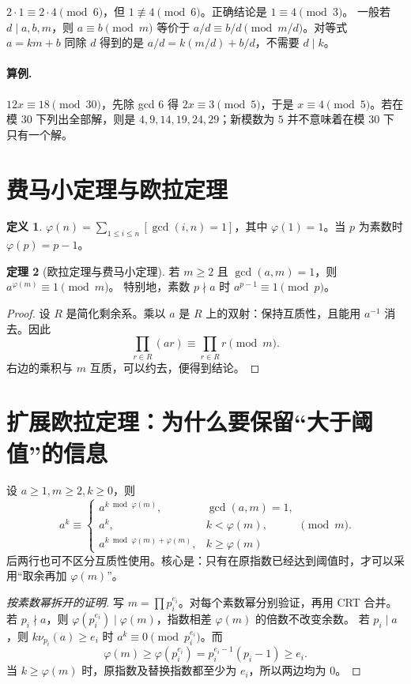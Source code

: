 \documentclass[UTF8,a4paper,11pt,oneside,openany,fontset=fandol]{ctexbook}
\theoremstyle{definition}
\newtheorem{definition}{定义}[chapter]
\newtheorem{theorem}[definition]{定理}
\newcommand{\iva}[1]{\left[#1\right]}
\begin{document}
\begin{pitfall}[把整数除法直接搬到同余式中会出错]
$2\cdot1\equiv2\cdot4\pmod6$，但 $1\not\equiv4\pmod6$。正确结论是 $1\equiv4\pmod3$。
一般若 $d\mid a,b,m$，则 $a\equiv b\pmod m$ 等价于 $a/d\equiv b/d\pmod{m/d}$。对等式 $a=km+b$ 同除 $d$ 得到的是 $a/d=k(m/d)+b/d$，不需要 $d\mid k$。
\end{pitfall}
\paragraph{算例.} $12x\equiv18\pmod{30}$，先除 gcd $6$ 得 $2x\equiv3\pmod5$，于是 $x\equiv4\pmod5$。若在模 $30$ 下列出全部解，则是 $4,9,14,19,24,29$；新模数为 $5$ 并不意味着在模 $30$ 下只有一个解。


\section{费马小定理与欧拉定理}
\begin{definition}
$\varphi(n)=\sum_{1\le i\le n}\iva{\gcd(i,n)=1}$，其中 $\varphi(1)=1$。当 $p$ 为素数时 $\varphi(p)=p-1$。
\end{definition}
\begin{theorem}[欧拉定理与费马小定理]
若 $m\ge2$ 且 $\gcd(a,m)=1$，则 $a^{\varphi(m)}\equiv1\pmod m$。
特别地，素数 $p\nmid a$ 时 $a^{p-1}\equiv1\pmod p$。
\end{theorem}
\begin{proof}
设 $R$ 是简化剩余系。乘以 $a$ 是 $R$ 上的双射：保持互质性，且能用 $a^{-1}$ 消去。因此
\[
 \prod_{r\in R}(ar)\equiv\prod_{r\in R}r\pmod m.
\]
右边的乘积与 $m$ 互质，可以约去，便得到结论。
\end{proof}


\section{扩展欧拉定理：为什么要保留“大于阈值”的信息}
设 $a\ge1,m\ge2,k\ge0$，则
\[
 a^k\equiv
 \begin{cases}
 a^{k\bmod\varphi(m)},&\gcd(a,m)=1,\\
 a^k,&k<\varphi(m),\\
 a^{k\bmod\varphi(m)+\varphi(m)},&k\ge\varphi(m)
 \end{cases}\pmod m.
\]
后两行也可不区分互质性使用。核心是：只有在原指数已经达到阈值时，才可以采用“取余再加 $\varphi(m)$”。


\begin{proof}[按素数幂拆开的证明]
写 $m=\prod p_i^{e_i}$。对每个素数幂分别验证，再用 CRT 合并。
若 $p_i\nmid a$，则 $\varphi(p_i^{e_i})\mid\varphi(m)$，指数相差 $\varphi(m)$ 的倍数不改变余数。
若 $p_i\mid a$，则 $k\nu_{p_i}(a)\ge e_i$ 时 $a^k\equiv0\pmod{p_i^{e_i}}$。而
\[
\varphi(m)\ge\varphi(p_i^{e_i})=p_i^{e_i-1}(p_i-1)\ge e_i.
\]
当 $k\ge\varphi(m)$ 时，原指数及替换指数都至少为 $e_i$，所以两边均为 $0$。
\end{proof}
\end{document}
